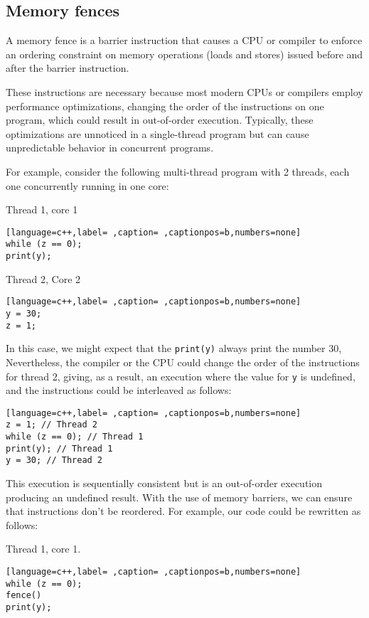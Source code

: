 \subsection{Memory fences}
\label{sec:org8a96e19}

A memory fence is a barrier instruction that causes a CPU or compiler to
enforce an ordering constraint on memory operations (loads and stores)
issued before and after the barrier instruction.

These instructions are necessary because most modern CPUs or compilers
employ performance optimizations, changing the order of the instructions on
one program, which could result in out-of-order execution. Typically, these optimizations are unnoticed in a single-thread program but can cause unpredictable behavior in concurrent programs.

For example, consider the following multi-thread program with 2
threads, each one concurrently running in one core:

Thread 1, core 1
\begin{lstlisting}[language=c++,label= ,caption= ,captionpos=b,numbers=none]
while (z == 0);
print(y);
\end{lstlisting}

Thread 2, Core 2
\begin{lstlisting}[language=c++,label= ,caption= ,captionpos=b,numbers=none]
y = 30;
z = 1;
\end{lstlisting}

In this case, we might expect that the \texttt{print(y)} always print the number 30,
Nevertheless, the compiler or the CPU could change the order of the
instructions for thread 2, giving, as a result, an execution where the value
for \texttt{y} is undefined, and the instructions could be interleaved as follows:

\begin{lstlisting}[language=c++,label= ,caption= ,captionpos=b,numbers=none]
z = 1; // Thread 2
while (z == 0); // Thread 1
print(y); // Thread 1
y = 30; // Thread 2
\end{lstlisting}

This execution is sequentially consistent but is an out-of-order
execution producing an undefined result. With the use of memory barriers, we
can ensure that instructions don't be reordered. For example, our code could
be rewritten as follows:

Thread 1, core 1.
\begin{lstlisting}[language=c++,label= ,caption= ,captionpos=b,numbers=none]
while (z == 0);
fence()
print(y);
\end{lstlisting}

